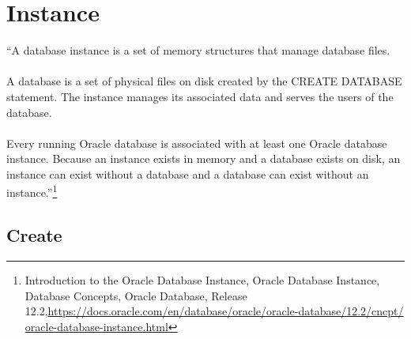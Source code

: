 
\newpage
\setcounter{secnumdepth}{0}

\section{Instance}

``A database instance is a set of memory structures that manage 
database files.\\
\\
A database is a set of physical files on disk created by the 
CREATE DATABASE statement.  The instance manages its associated 
data and serves the users of the database.\\
\\
Every running Oracle database is associated with at least one 
Oracle database instance.  Because an instance exists in memory
and a database exists on disk, an instance can exist without a 
database and a database can exist without an instance.''\footnote{Introduction to the Oracle Database Instance, Oracle Database Instance, Database Concepts, Oracle Database,
    Release 12.2,\href{https://docs.oracle.com/en/database/oracle/oracle-database/12.2/cncpt/oracle-database-instance.html}{https://docs.oracle.com/en/database/oracle/oracle-database/12.2/cncpt/}\newline
  \href{https://docs.oracle.com/en/database/oracle/oracle-database/12.2/cncpt/oracle-database-instance.html}{oracle-database-instance.html}}


\subsection{Create}

